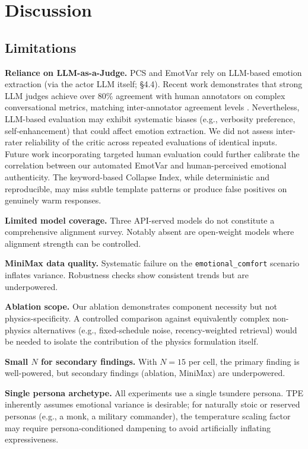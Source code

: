 \section{Discussion}

\subsection{Limitations}

\textbf{Reliance on LLM-as-a-Judge.} PCS and EmotVar rely on LLM-based emotion extraction (via the actor LLM itself; \S4.4). Recent work demonstrates that strong LLM judges achieve over 80\% agreement with human annotators on complex conversational metrics, matching inter-annotator agreement levels \cite{zheng2023judging}. Nevertheless, LLM-based evaluation may exhibit systematic biases (e.g., verbosity preference, self-enhancement) that could affect emotion extraction. We did not assess inter-rater reliability of the critic across repeated evaluations of identical inputs. Future work incorporating targeted human evaluation could further calibrate the correlation between our automated EmotVar and human-perceived emotional authenticity. The keyword-based Collapse Index, while deterministic and reproducible, may miss subtle template patterns or produce false positives on genuinely warm responses.

\textbf{Limited model coverage.} Three API-served models do not constitute a comprehensive alignment survey. Notably absent are open-weight models where alignment strength can be controlled.

\textbf{MiniMax data quality.} Systematic failure on the \texttt{emotional\_comfort} scenario inflates variance. Robustness checks show consistent trends but are underpowered.

\textbf{Ablation scope.} Our ablation demonstrates component necessity but not physics-specificity. A controlled comparison against equivalently complex non-physics alternatives (e.g., fixed-schedule noise, recency-weighted retrieval) would be needed to isolate the contribution of the physics formulation itself.

\textbf{Small $N$ for secondary findings.} With $N = 15$ per cell, the primary finding is well-powered, but secondary findings (ablation, MiniMax) are underpowered.

\textbf{Single persona archetype.} All experiments use a single tsundere persona. TPE inherently assumes emotional variance is desirable; for naturally stoic or reserved personas (e.g., a monk, a military commander), the temperature scaling factor may require persona-conditioned dampening to avoid artificially inflating expressiveness.

